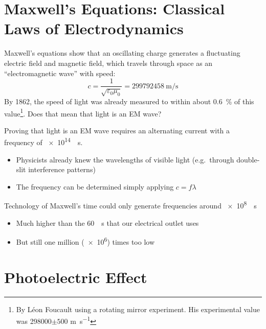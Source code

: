 \section{Maxwell's Equations: Classical Laws of Electrodynamics}
Maxwell's equations show that an oscillating charge generates a fluctuating
electric field and magnetic field, which travels through space as an
``electromagnetic wave'' with speed:
\begin{equation*}
  c=\frac1{\sqrt{\varepsilon_0\mu_0}}=\SI{299792458}{\meter\per\second}
\end{equation*}
By 1862, the speed of light was already measured to within about
\SI{.6}{\percent} of this value\footnote{By L\'{e}on Foucault using a
rotating mirror experiment. His experimental value was
\num{298000}$\pm 500$ \si{\metre\per\second}}. Does that mean that light is
an EM wave?




Proving that light is an EM wave requires an alternating current with a
frequency of \SI{e14}{\per\second}.
\begin{itemize}
\item Physicists already knew the wavelengths of visible light (e.g.\ through
  double-slit interference patterns)
\item The frequency can be determined simply applying $c=f\lambda$
\end{itemize}

Technology of Maxwell's time could only generate frequencies
around \SI{e8}{\per\second}
\begin{itemize}
\item Much higher than the \SI{60}{\per\second} that our electrical outlet
  uses
\item But still one million (\num{e6}) times too low
\end{itemize}




\section{Photoelectric Effect}

